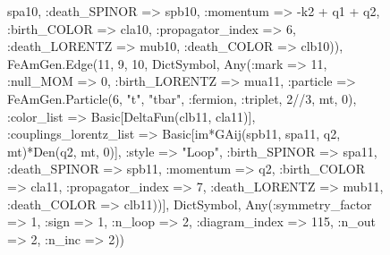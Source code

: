 \documentclass{revtex4}
\begin{document}
\begin{figure}[!htb]
\begin{center}
{spa10, :death_SPINOR => spb10, :momentum => -k2 + q1 + q2, :birth_COLOR => cla10, :propagator_index => 6, :death_LORENTZ => mub10, :death_COLOR => clb10)), FeAmGen.Edge(11, 9, 10, Dict{Symbol, Any}(:mark => 11, :null_MOM => 0, :birth_LORENTZ => mua11, :particle => FeAmGen.Particle(6, "t", "tbar", :fermion, :triplet, 2//3, mt, 0), :color_list => Basic[DeltaFun(clb11, cla11)], :couplings_lorentz_list => Basic[im*GAij(spb11, spa11, q2, mt)*Den(q2, mt, 0)], :style => "Loop", :birth_SPINOR => spa11, :death_SPINOR => spb11, :momentum => q2, :birth_COLOR => cla11, :propagator_index => 7, :death_LORENTZ => mub11, :death_COLOR => clb11))], Dict{Symbol, Any}(:symmetry_factor => 1, :sign => 1, :n_loop => 2, :diagram_index => 115, :n_out => 2, :n_inc => 2)) 
}
\end{center}
\end{figure}
\end{document}
